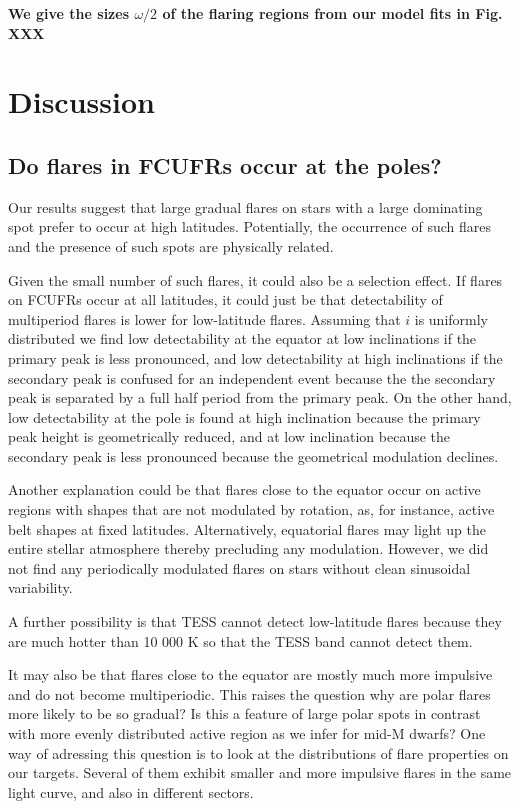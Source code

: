 \documentclass[fleqn,usenatbib,letters]{mnras}%
\begin{document}
\textbf{We give the sizes $\omega/2$ of the flaring regions from our model fits in Fig. XXX}
\section{Discussion}
\label{sec:discussion}

\subsection{Do flares in FCUFRs occur at the poles?}
Our results suggest that large gradual flares on stars with a large dominating spot prefer to occur at high latitudes. Potentially, the occurrence of such flares and the presence of such spots are physically related.

Given the small number of such flares, it could also be a selection effect. If flares on FCUFRs occur at all latitudes, it could just be that detectability of multiperiod flares is lower for low-latitude flares. Assuming that $i$ is uniformly distributed we find low detectability at the equator at low inclinations if the primary peak is less pronounced, and low detectability at high inclinations if the secondary peak is confused for an independent event because the the secondary peak is separated by a full half period from the primary peak. On the other hand, low detectability at the pole is found at high inclination because the primary peak height is geometrically reduced, and at low inclination because the secondary peak is less pronounced because the geometrical modulation declines.


Another explanation could be that flares close to the equator occur on active regions with shapes that are not modulated by rotation, as, for instance, active belt shapes at fixed latitudes. Alternatively, equatorial flares may light up the entire stellar atmosphere thereby precluding any modulation. However, we did not find any periodically modulated flares on stars without clean sinusoidal variability.

A further possibility is that TESS cannot detect low-latitude flares because they are much hotter than 10 000 K so that the TESS band cannot detect them.

It may also be that flares close to the equator are mostly much more impulsive and do not become multiperiodic. This raises the question why are polar flares more likely to be so gradual? Is this a feature of large polar spots in contrast with more evenly distributed active region as we infer for mid-M dwarfs? One way of adressing this question is to look at the distributions of flare properties on our targets. Several of them exhibit smaller and more impulsive flares in the same light curve, and also in different sectors.
\end{document}
